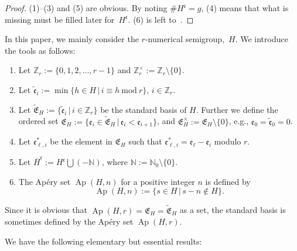 \documentclass[pdftex]{sigma}
\def\ZZ{{\mathbb Z}}
\def\NN{{\mathbb N}}
\def\fE{{\mathfrak E}}
\def\fc{{\mathfrak c}}
\def\fe{{\mathfrak e}}
\def\tfE{{\widetilde{\mathfrak E}}}
\def\tfe{{\widetilde{\mathfrak e}}}
\def\lH{{\overline H}}
\numberwithin{equation}{section}
\begin{document}
\begin{proof} (1)--(3) and (5) are obvious.
By noting $\# H^\fc =g$, (4) means that what is missing must be filled later for~$H^\fc$. (6) is left to~\cite{ADGS2016}.
\end{proof}

In this paper, we mainly consider the $r$-numerical semigroup,~$H$.
We introduce the tools as follows:

\begin{Definition}\label{2df:NSG1}\quad
\begin{enumerate}\itemsep=0pt

\item
Let $\ZZ_r:= \{ 0, 1, 2, \dots, r-1\}$ and $\ZZ_r^\times := \ZZ_r \setminus\{0\}$.

\item
Let $\tfe_i :=\min\{h \in H \, |\, i \equiv h \ \text{mod}\ r\}$,
$i \in \ZZ_r$.

\item Let $\tfE_H:=\{\tfe_i \, |\, i \in \ZZ_r\}$ be the standard basis of $H$.
Further we define the ordered set $\fE_H:=\{\fe_i \in \tfE_H \, | \, \fe_i < \fe_{i+1}\}$, and $\fE_H^\times := \fE_H\setminus \{0\}$, e.g., $\fe_{0}=\tfe_0=0$.

\item Let $\fe_{\ell,i}^*$ be the element in $\fE_H$ such that $\fe_{\ell,i}^*= \fe_\ell - \fe_i$ modulo $r$.

\item Let $\lH^\fc:= H^\fc \bigcup (-\NN)$, where $\NN:=\NN_0\setminus\{0\}$.

\item The Ap\'ery set $\operatorname{Ap}(H, n)$ for a positive integer $n$ is defined by
\[
\operatorname{Ap}(H,n):=\{s \in H\, |\, s-n\not\in H\}.
\]
\end{enumerate}
\end{Definition}

Since it is obvious that $\operatorname{Ap}(H, r)=\fE_H=\tfE_H$ as a set, the standard basis is sometimes defined by the Ap\'ery set $\operatorname{Ap}(H, r)$.

We have the following elementary but essential results:
\end{document}
